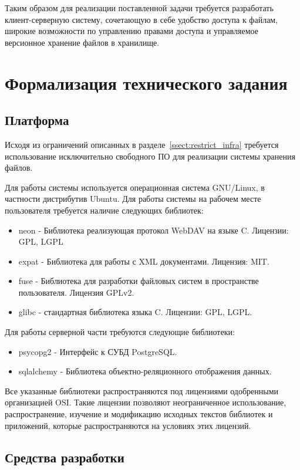 \documentclass[utf8,usehyperref,12pt]{G7-32}
\begin{document}
Таким образом для реализации поставленной задачи требуется разработать клиент-серверную систему, сочетающую в себе удобство доступа к файлам, широкие возможности по управлению правами доступа и управляемое версионное хранение файлов в хранилище.

\section{Формализация технического задания}
\subsection{Платформа}\label{ssect:platform}
Исходя из ограничений описанных в разделе~\ref{ssect:restrict_infra} требуется использование исключительно свободного ПО для реализации системы хранения файлов. 

Для работы системы используется операционная система GNU/Linux, в частности дистрибутив Ubuntu. Для работы системы на рабочем месте пользователя требуется наличие следующих библиотек:

\begin{itemize}
 \item neon - Библиотека реализующая протокол WebDAV на языке C. Лицензии: GPL, LGPL
 \item expat - Библиотека для работы с XML документами. Лицензия: MIT.
 \item fuse - Библиотека для разработки файловых систем в пространстве пользователя. Лицензия GPLv2.
 \item glibc - стандартная библиотека языка C. Лицензии: GPL, LGPL.
\end{itemize}

Для работы серверной части требуются следующие библиотеки:

\begin{itemize}
 \item psycopg2 - Интерфейс к СУБД PostgreSQL.
 \item sqlalchemy - Библиотека объектно-реляционного отображения данных.
\end{itemize}
Все указанные библиотеки распространяются под лицензиями одобренными организацией OSI. Такие лицензии позволяют неограниченное использование, распространение, изучение и модификацию исходных текстов библиотек и приложений, которые распространяются на условиях этих лицензий.

\subsection{Средства разработки}
\end{document}
